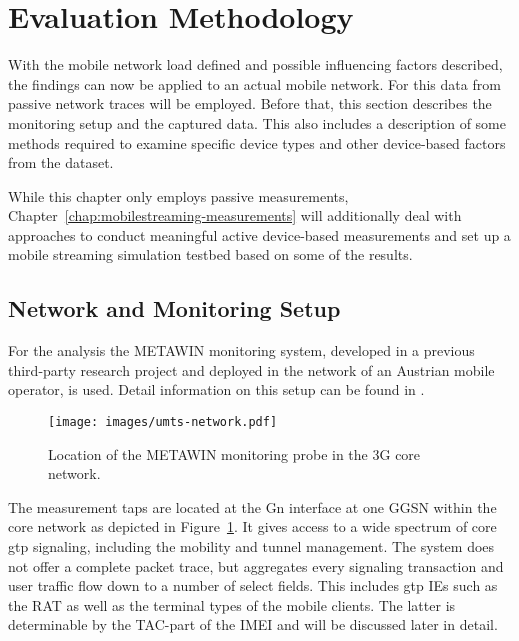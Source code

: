 \section{Evaluation Methodology}
\label{c4:sec:methodology}

With the mobile network load defined and possible influencing factors described, the findings can now be applied to an actual mobile network. For this data from passive network traces will be employed. Before that, this section describes the monitoring setup and the captured data. This also includes a description of some methods required to examine specific device types and other device-based factors from the dataset.

While this chapter only employs passive measurements, Chapter~\ref{chap:mobilestreaming-measurements} will additionally deal with approaches to conduct meaningful active device-based measurements and set up a mobile streaming simulation testbed based on some of the results.


\subsection{Network and Monitoring Setup}

For the analysis the \acrshort{METAWIN} monitoring system, developed in a previous third-party research project and deployed in the network of an Austrian mobile operator, is used. Detail information on this setup can be found in \cite{ricciato_2011,ricciato2006traffic}.

\begin{figure}[htb]
	\centering
	\texttt{[image: images/umts-network.pdf]}
	\caption{Location of the \acrshort{METAWIN} monitoring probe in the \acrshort{3G} core network.}
\label{c4:fig:umtsnetwork}
\end{figure}

The measurement taps are located at the Gn interface at one \gls{GGSN} within the core network as depicted in Figure~\ref{c4:fig:umtsnetwork}. It gives access to a wide spectrum of core \gls{gtp} signaling, including the mobility and tunnel management. The system does not offer a complete packet trace, but aggregates every signaling transaction and user traffic flow down to a number of select fields. This includes \gls{gtp} \glspl{IE} such as the \gls{RAT} as well as the terminal types of the mobile clients. The latter is determinable by the \acrshort{TAC}-part of the \gls{IMEI} and will be discussed later in detail.

